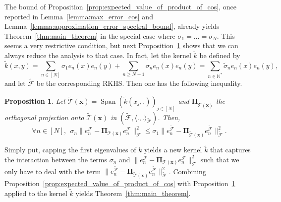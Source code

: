 \documentclass[twoside,11pt]{book}
\newtheorem{proposition}{Proposition}
\numberwithin{theorem}{chapter}
\numberwithin{definition}{chapter}
\numberwithin{proposition}{chapter}
\numberwithin{corollary}{chapter}
\numberwithin{example}{chapter}
\numberwithin{lemma}{chapter}
\DeclareMathOperator{\Span}{\mathrm{Span}}
\begin{document}
The bound of Proposition~\ref{prop:expected_value_of_product_of_cos}, once reported in  Lemma~\ref{lemma:max_error_cos} and Lemma~\ref{lemma:approximation_error_spectral_bound}, already yields Theorem~\ref{thm:main_theorem} in the special case where $\sigma_{1} = \dots = \sigma_{N}$. This seems a very restrictive condition, but next Proposition~\ref{prop:kernel_perturbation_inequality} shows that we can always reduce the analysis to that case.
In fact, let the kernel $\tilde{k}$ be defined by
\begin{equation}\label{eq:tilde_k_kernel_definition}
\tilde{k}(x,y) = \sum\limits_{n \in [N]} \sigma_{1}e_{n}(x)e_{n}(y) + \sum\limits_{n \geq N+1} \sigma_{n}e_{n}(x)e_{n}(y) = \sum\limits_{n \in \mathbb{N}^{*}} \tilde{\sigma}_{n}e_{n}(x)e_{n}(y),
\end{equation}
and let $\tilde{\mathcal{F}}$ be the corresponding RKHS. Then one has the following inequality.
\begin{proposition}\label{prop:kernel_perturbation_inequality}
Let $ \tilde{\mathcal{T}}(\bm{x}) = \Span \left( \tilde{k}(x_{j},.) \right)_{j \in [N]}$ and $\bm{\Pi}_{\tilde{\mathcal{T}}(\bm{x})}$ the orthogonal projection onto $\tilde{\mathcal{T}}(\bm{x})$ in $(\tilde{\mathcal{F}}, \langle .,.\rangle_{\tilde{\mathcal{F}}})$. Then,
\begin{equation}\label{eq:kernel_perturbation_inequality}
	\forall n \in [N], \:\: \sigma_{n} \|e_{n}^{\mathcal{F}} - \bm{\Pi}_{\mathcal{T}(\bm{x})} e_{n}^{\mathcal{F}}\|_{\mathcal{F}}^{2} \leq \sigma_{1}   \|e_{n}^{\tilde{\mathcal{F}}} - \bm{\Pi}_{\tilde{\mathcal{T}}(\bm{x})} e_{n}^{\tilde{\mathcal{F}}}\|_{\tilde{\mathcal{F}}}^{2}.
\end{equation}
\end{proposition}
Simply put, capping the first eigenvalues of $k$ yields a new kernel $\tilde{k}$ that captures the interaction between the terms $\sigma_{n}$ and $\|e_{n}^{\mathcal{F}} - \bm{\Pi}_{\mathcal{T}(\bm{x})} e_{n}^{\mathcal{F}}\|_{\mathcal{F}}^{2}$ such that we only have to deal with the term $\|e_{n}^{\tilde{\mathcal{F}}} - \bm{\Pi}_{\tilde{\mathcal{T}}(\bm{x})} e_{n}^{\tilde{\mathcal{F}}}\|_{\tilde{\mathcal{F}}}^{2}$.
Combining  Proposition~\ref{prop:expected_value_of_product_of_cos} with Proposition~\ref{prop:kernel_perturbation_inequality} applied to the kernel $\tilde{k}$ yields Theorem~\ref{thm:main_theorem}. 
\end{document}
